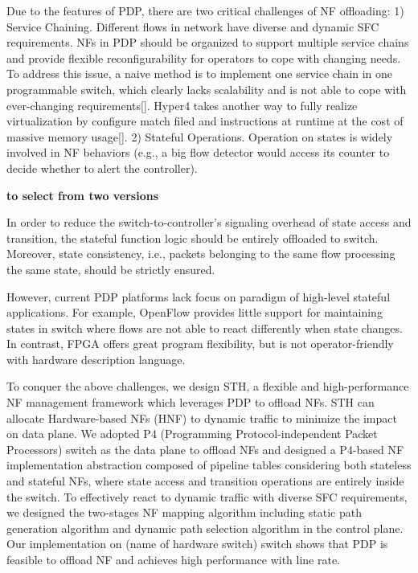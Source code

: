 \documentclass[10pt, conference, letterpaper]{IEEEtran}
\begin{document}
Due to the features of PDP, there are two critical challenges of NF offloading: 
1) Service Chaining. Different flows in network have diverse and dynamic SFC requirements. NFs in PDP should be organized to support multiple service chains and provide flexible reconfigurability for operators to cope with changing needs. To address this issue, a naive method is to implement one service chain in one programmable switch, which clearly lacks scalability and is not able to cope with ever-changing requirements[]. Hyper4 takes another way to fully realize virtualization by configure match filed and instructions at runtime at the cost of massive memory usage[].
2) Stateful Operations. Operation on states is widely involved in NF behaviors (e.g., a big flow detector would access its counter to decide whether to alert the controller). 

\textbf{to select from two versions}

In order to reduce the switch-to-controller's signaling overhead of state access and transition, the stateful function logic should be entirely offloaded to switch. Moreover, state consistency, i.e., packets belonging to the same flow processing the same state, should be strictly ensured.

However, current PDP platforms lack focus on paradigm of high-level stateful applications. For example, OpenFlow provides little support for maintaining states in switch where flows are not able to react differently when state changes. In contrast, FPGA offers great program flexibility, but is not operator-friendly with hardware description language.


To conquer the above challenges, we design STH, a flexible and high-performance NF management framework which leverages PDP to offload NFs. STH can allocate Hardware-based NFs (HNF) to dynamic traffic to minimize the impact on data plane. 
We adopted P4 (Programming Protocol-independent Packet Processors) switch as the data plane to offload NFs and designed a P4-based NF implementation abstraction composed of pipeline tables considering both stateless and stateful NFs, where state access and transition operations are entirely inside the switch. To effectively react to dynamic traffic with diverse SFC requirements, we designed the two-stages NF mapping algorithm including static path generation algorithm and dynamic path selection algorithm in the control plane. Our implementation on (name of hardware switch) switch shows that PDP is feasible to offload NF and achieves high performance with line rate.
\end{document}
